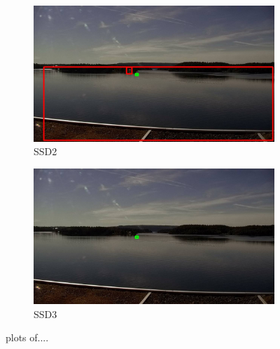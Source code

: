 \begin{figure}[h!]
\begin{subfigure}{.5\textwidth}
  \centering
  \includegraphics[width=0.9\linewidth]{results/case_buildings/bigbox_bcbf/SSD2/selected_08_07_frame0290.jpg}
  \caption{SSD2}
  \label{fig:sfig1}
\end{subfigure}%
\begin{subfigure}{.5\textwidth}
  \centering
  \includegraphics[width=.9\linewidth]{results/case_buildings/bigbox_bcbf/SSD3/selected_08_07_frame0290.jpg}
  \caption{SSD3}
  \label{fig:sfig2}
\end{subfigure}

\caption{plots of....}
\label{fig:fig}
\end{figure}

